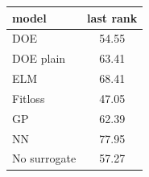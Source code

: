 \begin{tabular}{|lc|}
\hline
model & last rank\\
\hline
DOE & 54.55 \\
DOE plain & 63.41 \\
ELM & 68.41 \\
Fitloss & 47.05 \\
GP & 62.39 \\
NN & 77.95 \\
No surrogate & 57.27 \\
\hline
\end{tabular}
